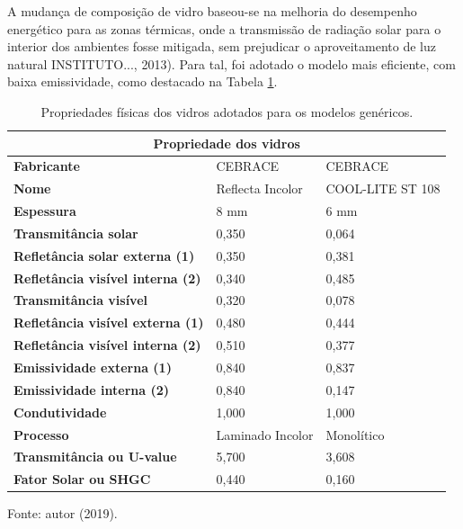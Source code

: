 \noindent A mudança de composição de vidro baseou-se na melhoria do desempenho energético para as zonas térmicas, onde a transmissão de radiação solar para o interior dos ambientes fosse mitigada, sem prejudicar o aproveitamento de luz natural \cite{CentroBrasileirodeEficienciaEnergeticaemEdificacoesCB3E2015,AssociacaoBrasileiradeNormasTecnicas-ABNT2013a,InstitutoNacionaldeMetrologiaNormalizacaoeQualidadeIndustrial-INMETRO2013,Ferreira2017} INSTITUTO..., 2013). Para tal, foi adotado o modelo mais eficiente, com baixa emissividade, como destacado na Tabela \ref{tab:tabela12}.
\begin{table}[H]
    \centering
    \small
    \caption{Propriedades físicas dos vidros adotados para os modelos genéricos.}
    \label{tab:tabela12}
    \begin{tabular}{lll}
    \hline
    \multicolumn{3}{c}{\textbf{Propriedade dos vidros}}                            \\ \hline
    \textbf{Fabricante}                      & CEBRACE          & CEBRACE          \\ \hline
    \textbf{Nome}                            & Reflecta Incolor & COOL-LITE ST 108 \\ \hline
    \textbf{Espessura}                       & 8 mm             & 6 mm             \\ \hline
    \textbf{Transmitância solar}             & 0,350            & 0,064            \\ \hline
    \textbf{Refletância solar externa (1)}   & 0,350            & 0,381            \\ \hline
    \textbf{Refletância visível interna (2)} & 0,340            & 0,485            \\ \hline
    \textbf{Transmitância visível}           & 0,320            & 0,078            \\ \hline
    \textbf{Refletância visível externa (1)} & 0,480            & 0,444            \\ \hline
    \textbf{Refletância visível interna (2)} & 0,510            & 0,377            \\ \hline
    \textbf{Emissividade externa (1)}        & 0,840            & 0,837            \\ \hline
    \textbf{Emissividade interna (2)}        & 0,840            & 0,147            \\ \hline
    \textbf{Condutividade}                   & 1,000            & 1,000            \\ \hline
    \textbf{Processo}                        & Laminado Incolor & Monolítico       \\ \hline
    \textbf{Transmitância ou U-value}        & 5,700            & 3,608            \\ \hline
    \textbf{Fator Solar ou SHGC}             & 0,440            & 0,160            \\ \hline
    \end{tabular}
    \begin{flushleft}
        \par \small Fonte: autor (2019).
    \end{flushleft}
    \end{table}
